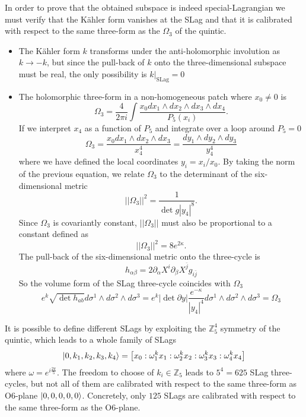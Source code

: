 In order to prove that the obtained subspace is indeed special-Lagrangian we must
verify that the Kähler form vanishes at the SLag and that it is calibrated with respect to the
same three-form as the $\Omega_3$ of the quintic.
\begin{itemize}
  \item The Kähler form $k$ transforms under the anti-holomorphic involution as $k\to -k$, 
    but since the pull-back of $k$ onto the three-dimensional subspace must be real, 
    the only possibility is $k\rvert_{\mathrm{SLag}}=0$

  \item 
The holomorphic three-form in a non-homogeneous patch where $x_0\neq0$ is
\begin{equation}
  \Omega_3=\frac{4}{2\pi i}\int \frac{x_0 dx_1\wedge dx_2 \wedge dx_3 \wedge dx_4}{P_5(x_i)}.
  \label{eq:3form}
\end{equation}
If we interpret $x_4$ as a function of $P_5$ and integrate over a loop around $P_5=0$
\begin{equation}
  \Omega_3=\frac{x_0 dx_1\wedge dx_2 \wedge dx_3}{x_4^4}
  =\frac{dy_1\wedge dy_2\wedge dy_3}{y_4^4}
\end{equation}
where we have defined the local coordinates $y_i=x_i/x_0$.
By taking the norm of the previous equation, we relate $\Omega_3$ to the determinant of the 
six-dimensional metric
\begin{equation}
  ||\Omega_3||^2 = \frac{1}{\det g |y_4|^8}.
\end{equation}
Since $\Omega_3$ is covariantly constant, $||\Omega_3||$ must also be proportional to a constant defined as
\begin{equation}
  ||\Omega_3||^2 = 8e^{2\kappa}.
\end{equation}
The pull-back of the six-dimensional metric onto the three-cycle is
\begin{equation}
  h_{\alpha\beta}=2\partial_\alpha X^i \partial_\beta X^{\bar j}g_{i\bar j}
\end{equation}
So the volume form of the SLag three-cycle coincides with $\Omega_3$
\begin{equation}
  e^k \sqrt{\det h_{ab}}d\sigma^1\wedge d\sigma^2\wedge d\sigma^3
  =e^k |\det \partial y| \frac{e^{-\kappa}}{|y_4|^4}d\sigma^1\wedge d\sigma^2\wedge d\sigma^3=\Omega_3
\end{equation}
\end{itemize}

It is possible to define different SLags by exploiting the $\mathbb Z_5^4$ symmetry of the quintic,
which leads to a whole family of SLags
\begin{equation}
  \ket{0,k_1,k_2,k_3,k_4} = {\qty[x_0:\omega^k_1 x_1:\omega^k_2 x_2:\omega^k_3 x_3:\omega^k_4 x_4]}
\end{equation}
where $\omega=e^{i\frac{2\pi}{5}}$. 
The freedom to choose of $k_i\in \mathbb Z_5$ leads to $5^4=625$ SLag three-cycles, but not all of them are calibrated
with respect to the same three-form as O$6$-plane $\ket{0,0,0,0,0}$.
Concretely, only $125$ SLags are calibrated with respect to the same three-form as the O$6$-plane.

